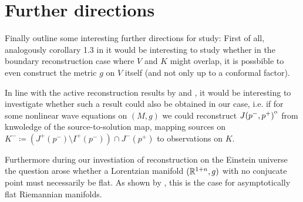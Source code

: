 \chapter*{Further directions}
Finally outline some interesting further directions for study: First of all, analogously corollary 1.3 in \cite{kurylev2017inverse} it would be interesting to study whether in the boundary reconstruction case where $V$ and $K$ might overlap, it is possbible to even construct the metric $g$ on $V$ itself (and not only up to a conformal factor).

In line with the active reconstruction results by \cite{wang2019inverse} and \cite{lassas2018inverse}, it would be interesting to investigate whether such a result could also be obtained in our case, i.e. if for some nonlinear wave equations on $(M,g)$ we could reconstruct ${\kern0ptJ(p^-,p^+)}^{\mathrm{o}}$ from knwoledge of the source-to-solution map, mapping sources on $K^-\coloneqq  (J^+(p^-)\setminus I^+(p^-)) \cap J^-(p^+)$ to observations on $K$.

Furthermore during our investiation of reconstruction on the Einstein universe the question arose whether a Lorentzian manifold $(\mathbb{R}^{1+n},g)$ with no conjucate point must necessarily be flat. As shown by \citet{guillarmou2019asymptotically}, this is the case for asymptotically flat Riemannian manifolds.